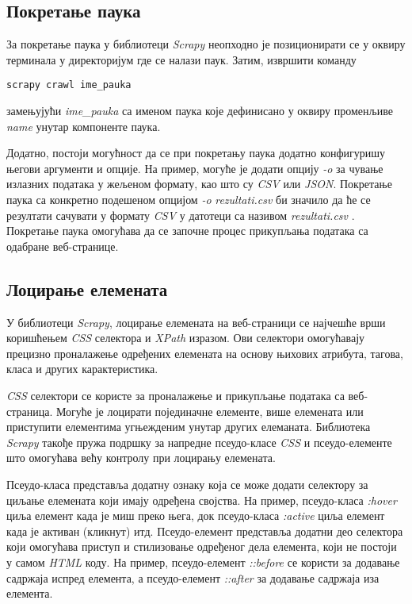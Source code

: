 \documentclass[12pt,oneside]{memoir}
\begin{document}
\subsection{Покретање паука}
За покретање паука у библиотеци \textit{Scrapy} неопходно је позиционирати се у оквиру терминала у директоријум где се налази паук. Затим, извршити команду
\begin{verbatim}
scrapy crawl ime_pauka
\end{verbatim}
замењујући \textit{ime\_pauka} са именом паука које дефинисано у оквиру променљиве \textit{name} унутар компоненте паука. 

Додатно, постоји могућност да се при покретању паука додатно конфигуришу његови аргументи и опције. На пример, могуће је додати опцију \textit{-o} за чување излазних података у жељеном формату, као што су \textit{CSV} или \textit{JSON}. Покретање паука са конкретно подешеном опцијом \textit{-o} \textit{rezultati.csv} би значило да ће се резултати сачувати у формату \textit{CSV} у датотеци са називом \textit{rezultati.csv} \cite{WebScrapingWithPython}. Покретање паука омогућава да се започне процес прикупљања података са одабране веб-странице.

\subsection{Лоцирање елемената}
У библиотеци \textit{Scrapy}, лоцирање елемената на веб-страници се најчешће врши коришћењем \textit{CSS} селектора и \textit{XPath} изразом. Ови селектори омогућавају прецизно проналажење одређених елемената на основу њихових атрибута, тагова, класа и других карактеристика.

\textit{CSS} селектори се користе за проналажење и прикупљање података са веб-страница. Могуће је лоцирати појединачне елементе, више елемената или приступити елементима угњежденим унутар других елеманата. Библиотека \textit{Scrapy} такође пружа подршку за напредне псеудо-класе \textit{CSS} и псеудо-елементе што омогућава већу контролу при лоцирању елемената.

Псеудо-класа представља додатну ознаку која се може додати селектору за циљање елемената који имају одређена својства. На пример, псеудо-класа \textit{:hover} циља елемент када је миш преко њега, док псеудо-класа \textit{:active} циља елемент када је активан (кликнут) итд. Псеудо-елемент представља додатни део селектора који омогућава приступ и стилизовање одређеног дела елемента, који не постоји у самом  \textit{HTML} коду. На пример, псеудо-елемент \textit{::before} се користи за додавање садржаја испред елемента, а псеудо-елемент \textit{::after} за додавање садржаја иза елемента.
\end{document}
